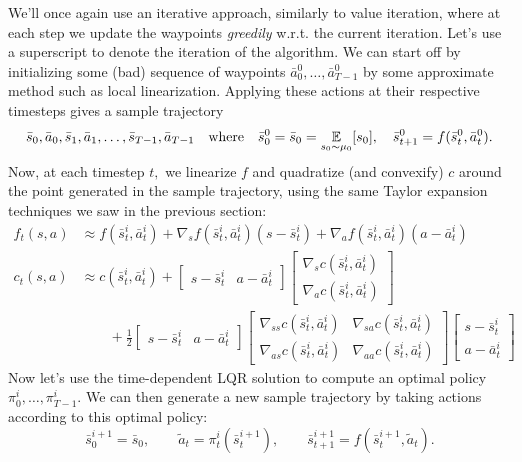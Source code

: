\documentclass[../main/main]{subfiles}
\begin{document}
We'll once again use an iterative approach, similarly to value iteration, where at each step we update the waypoints \emph{greedily} w.r.t. the current iteration.
Let's use a superscript to denote the iteration of the algorithm.
We can start off by initializing some (bad) sequence of waypoints $\bar a^0_0, \dots, \bar a^0_{T-1}$ by some approximate method such as local linearization.
Applying these actions at their respective timesteps gives a sample trajectory \[
    \bar s_0, \bar a_0, \bar s_1, \bar a_1, \dots, \bar s_{T-1}, \bar a_{T-1} \quad \text{where} \quad
    \bar s^0_0 = \bar s_0 = \operatorname*{\mathbb{E}}_{s_0 \sim \mu_0} [s_0], \quad \bar s^0_{t+1} = f(\bar s^0_t, \bar a^0_t).
\]
Now, at each timestep $t,$ we linearize $f$ and quadratize (and convexify) $c$ around the point generated in the sample trajectory, using the same Taylor expansion techniques we saw in the previous section:
\begingroup
\newcommand{\iter}[1]{\bar {#1}^i_t}
\newcommand{\grad}[2]{\nabla_{#2} #1(\iter s, \iter a)}
\begin{align*}
    f_t(s, a) &\approx f(\iter s, \iter a) + \grad f s (s - \iter s) + \grad f a (a - \iter a) \\
    c_t(s, a) &\approx c(\iter s, \iter a) + \begin{bmatrix}
        s - \iter s & a - \iter a
    \end{bmatrix} \begin{bmatrix}
        \grad c s \\
        \grad c a
    \end{bmatrix} \\
    &\qquad + \frac{1}{2} \begin{bmatrix}
        s - \iter s & a - \iter a
    \end{bmatrix} \begin{bmatrix}
        \nabla_{ss} c(\iter s, \iter a) & \nabla_{sa} c(\iter s, \iter a) \\
        \nabla_{as} c(\iter s, \iter a) & \nabla_{aa} c(\iter s, \iter a)
    \end{bmatrix}
    \begin{bmatrix}
        s - \iter s \\
        a - \iter a
    \end{bmatrix}
\end{align*}
\endgroup
Now let's use the time-dependent LQR solution to compute an optimal policy $\pi^i_0, \dots, \pi^i_{T-1}.$ We can then generate a new sample trajectory by taking actions according to this optimal policy: \[
    \bar s^{i+1}_0 = \bar s_0, \qquad \tilde a_t = \pi^i_t(\bar s^{i+1}_t), \qquad \bar s^{i+1}_{t+1} = f(\bar s^{i+1}_t, \tilde a_t).
\]
\end{document}
